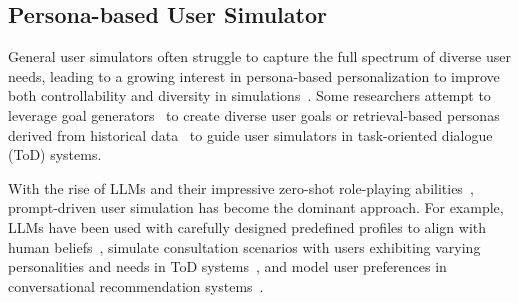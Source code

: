 \subsection{Persona-based User Simulator}

General user simulators often struggle to capture the full spectrum of diverse user needs, leading to a growing interest in persona-based personalization to improve both controllability and diversity in simulations~\cite{takanobu2020multi}. Some researchers attempt to leverage goal generators~\cite{takanobu2020multi} to create diverse user goals or retrieval-based personas derived from historical data~\cite{shi2019build} to guide user simulators in task-oriented dialogue (ToD) systems.

With the rise of LLMs and their impressive zero-shot role-playing abilities~\cite{njifenjou2024role}, prompt-driven user simulation has become the dominant approach. For example, LLMs have been used with carefully designed predefined profiles to align with human beliefs~\cite{ChuangNSGFYSHR24}, simulate consultation scenarios with users exhibiting varying personalities and needs in ToD systems~\cite{ZhangH0LLWLC24}, and model user preferences in conversational recommendation systems~\cite{yoon2024evaluating}.


